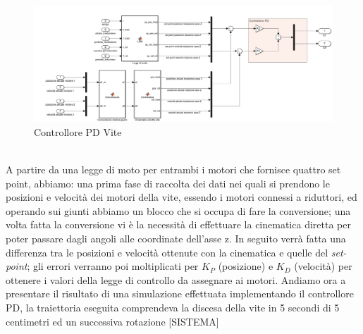 \begin{figure}[ht]
	\begin{center}
		\includegraphics[scale=0.35]{Immagini/Controllori/Vite}
		\caption{Controllore PD Vite}
		\label{fig:PDVite}
	\end{center}
\end{figure}
\\A partire da una legge di moto per entrambi i motori che fornisce quattro set point, abbiamo: una prima fase di raccolta dei dati nei quali si prendono le posizioni e velocità dei motori della vite, essendo i motori connessi a riduttori, ed operando sui giunti abbiamo un blocco che si occupa di fare la conversione; una volta fatta la conversione vi è la necessità di effettuare la cinematica diretta per poter passare dagli angoli alle coordinate dell'asse z. In seguito verrà fatta una differenza tra le posizioni e velocità ottenute con la cinematica e quelle del \textit{set-point}; gli errori verranno poi moltiplicati per $K_P$ (posizione) e $K_D$ (velocità) per ottenere i valori della legge di controllo da assegnare ai motori.
Andiamo ora a presentare il risultato di una simulazione effettuata implementando il controllore PD, la traiettoria eseguita comprendeva la discesa della vite in 5 secondi di 5 centimetri ed un successiva rotazione [SISTEMA]
